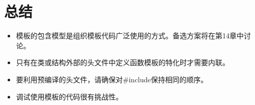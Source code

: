 \section{总结}

\begin{itemize}
\item 
模板的包含模型是组织模板代码广泛使用的方式。备选方案将在第14章中讨论。

\item 
只有在类或结构外部的头文件中定义函数模板的特化时才需要内联。

\item 
要利用预编译的头文件，请确保对\#include保持相同的顺序。

\item 
调试使用模板的代码很有挑战性。
\end{itemize}